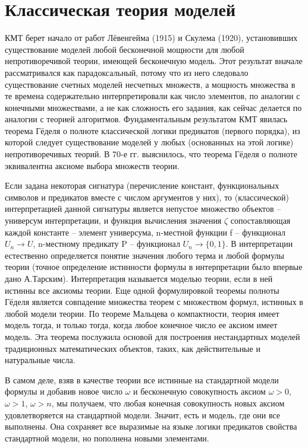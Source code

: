 \documentclass[12pt, a4paper]{article}
\begin{document}
\section{Классическая теория моделей}

КМТ берет начало от работ Лёвенгейма (1915) и Скулема (1920), установивших существование
моделей любой бесконечной мощности для любой непротиворечивой теории, имеющей бесконечную
модель. Этот результат вначале рассматривался как парадоксальный, потому что из него следовало
существование счетных моделей несчетных множеств, а мощность множества в те времена
содержательно интерпретировали как число элементов, по аналогии с конечными множествами, а не
как сложность его задания, как сейчас делается по аналогии с теорией алгоритмов. Фундаментальным
результатом КМТ явилась теорема Гёделя о полноте классической логики предикатов (первого
порядка), из которой следует существование моделей у любых (основанных на этой логике)
непротиворечивых теорий. В 70-е гг. выяснилось, что теорема Гёделя о полноте эквивалентна аксиоме
выбора множеств теории.

Если задана некоторая сигнатура (перечисление констант, функциональных символов и предикатов
вместе с числом аргументов у них), то (классической) интерпретацией данной сигнатуры является
непустое множество объектов – универсум интерпретации, и функция вычисления значения $\zeta$
сопоставляющая каждой константе – элемент универсума, n-местной функции f – функционал $U_n \rightarrow U$,
n-местному предикату P – функционал $U_n \rightarrow \{0,1\}$. В интерпретации естественно
определяется
понятие значения любого терма и любой формулы теории (точное определение истинности формулы в
интерпретации было впервые дано А.Тарским). Интерпретация называется моделью теории, если в ней
истинны все аксиомы теории. Еще одной формулировкой теоремы полноты Гёделя является
совпадение множества теорем с множеством формул, истинных в любой модели теории.
По теореме Мальцева о компактности, теория имеет модель тогда, и только тогда, когда любое
конечное число ее аксиом имеет модель. Эта теорема послужила основой для построения
нестандартных моделей традиционных математических объектов, таких, как действительные и
натуральные числа.

В самом деле, взяв в качестве теории все истинные на стандартной модели формулы и добавив новое
число $\omega$ и бесконечную совокупность аксиом $\omega > 0$, $\omega > 1$, $\omega > n$, мы получаем, что любая конечная
совокупность новых аксиом удовлетворяется на стандартной модели. Значит, есть и модель, где они
все выполнены. Она сохраняет все выразимые на языке логики предикатов свойства стандартной
модели, но пополнена новыми элементами.
\end{document}
